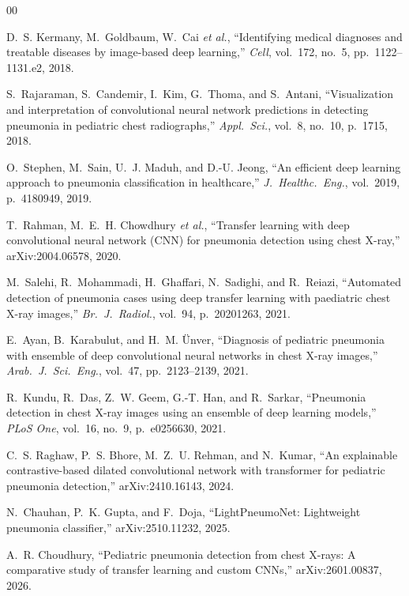 \documentclass[conference]{IEEEtran}
\begin{document}
\begin{thebibliography}{00}

D.~S. Kermany, M.~Goldbaum, W.~Cai \textit{et al.}, ``Identifying medical diagnoses and treatable diseases by image-based deep learning,'' \textit{Cell}, vol.~172, no.~5, pp.~1122--1131.e2, 2018.

S.~Rajaraman, S.~Candemir, I.~Kim, G.~Thoma, and S.~Antani, ``Visualization and interpretation of convolutional neural network predictions in detecting pneumonia in pediatric chest radiographs,'' \textit{Appl.\ Sci.}, vol.~8, no.~10, p.~1715, 2018.

O.~Stephen, M.~Sain, U.~J. Maduh, and D.-U. Jeong, ``An efficient deep learning approach to pneumonia classification in healthcare,'' \textit{J.\ Healthc.\ Eng.}, vol.~2019, p.~4180949, 2019.

T.~Rahman, M.~E.~H. Chowdhury \textit{et al.}, ``Transfer learning with deep convolutional neural network (CNN) for pneumonia detection using chest X-ray,'' arXiv:2004.06578, 2020.

M.~Salehi, R.~Mohammadi, H.~Ghaffari, N.~Sadighi, and R.~Reiazi, ``Automated detection of pneumonia cases using deep transfer learning with paediatric chest X-ray images,'' \textit{Br.\ J.\ Radiol.}, vol.~94, p.~20201263, 2021.

E.~Ayan, B.~Karabulut, and H.~M. \"Unver, ``Diagnosis of pediatric pneumonia with ensemble of deep convolutional neural networks in chest X-ray images,'' \textit{Arab.\ J.\ Sci.\ Eng.}, vol.~47, pp.~2123--2139, 2021.

R.~Kundu, R.~Das, Z.~W. Geem, G.-T. Han, and R.~Sarkar, ``Pneumonia detection in chest X-ray images using an ensemble of deep learning models,'' \textit{PLoS One}, vol.~16, no.~9, p.~e0256630, 2021.

C.~S. Raghaw, P.~S. Bhore, M.~Z.~U. Rehman, and N.~Kumar, ``An explainable contrastive-based dilated convolutional network with transformer for pediatric pneumonia detection,'' arXiv:2410.16143, 2024.

N.~Chauhan, P.~K. Gupta, and F.~Doja, ``LightPneumoNet: Lightweight pneumonia classifier,'' arXiv:2510.11232, 2025.

A.~R. Choudhury, ``Pediatric pneumonia detection from chest X-rays: A comparative study of transfer learning and custom CNNs,'' arXiv:2601.00837, 2026.

\end{thebibliography}
\end{document}

